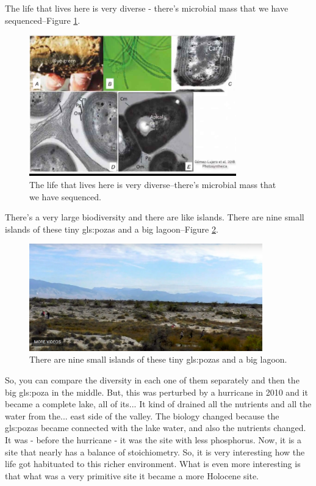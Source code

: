 \documentclass[]{article}
\begin{document}
The life that lives here is very diverse - there's microbial mass that we have sequenced--Figure \ref{fig:PosasBiodiversity}.

\begin{figure}[H]
	\begin{center}
		\caption[The life that lives here is very diverse]{The life that lives here is very diverse--there's microbial mass that we have sequenced.}\label{fig:PosasBiodiversity}
		\includegraphics[width=0.8\textwidth]{PosasBiodiversity}
	\end{center}
\end{figure}

There's a very large biodiversity and there are like islands. There are nine small islands of these tiny \gls{gls:poza}s and a big lagoon--Figure \ref{fig:CuatroCienegas7}.

\begin{figure}[H]
	\caption{There are nine small islands of these tiny \gls{gls:poza}s and a big lagoon.}\label{fig:CuatroCienegas7} 
	\includegraphics[width=0.9\textwidth]{CuatroCienegas7}
\end{figure}

So, you can compare the diversity in each one of them separately and then the big \gls{gls:poza} in the middle. But, this was perturbed by a hurricane in 2010 and it became a complete lake, all of its... It kind of drained all the nutrients and all the water from the... east side of the valley. The biology changed because the \gls{gls:poza}s became connected 
with the lake water, and also the nutrients changed. It was - before the hurricane - it was the site with less phosphorus. Now, it is a site that nearly has a balance of stoichiometry. So, it is very interesting how the life got habituated to this richer environment. What is even more interesting is that what was a very primitive site it became a more Holocene site.
\end{document}

